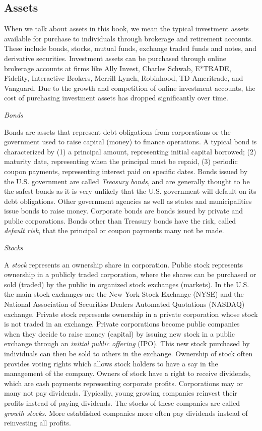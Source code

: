 \documentclass[
  letterpaper,
  DIV=11,
  numbers=noendperiod]{scrreprt}
\theoremstyle{definition}
\theoremstyle{definition}
\theoremstyle{remark}
\begin{document}
\hypertarget{assets}{%
\subsection{Assets}\label{assets}}

When we talk about assets in this book, we mean the typical investment
assets available for purchase to individuals through brokerage and
retirement accounts. These include bonds, stocks, mutual funds, exchange
traded funds and notes, and derivative securities. Investment assets can
be purchased through online brokerage accounts at firms like Ally
Invest, Charles Schwab, E*TRADE, Fidelity, Interactive Brokers, Merrill
Lynch, Robinhood, TD Ameritrade, and Vanguard. Due to the growth and
competition of online investment accounts, the cost of purchasing
investment assets has dropped significantly over time.

\emph{Bonds}

Bonds are assets that represent debt obligations from corporations or
the government used to raise capital (money) to finance operations. A
typical bond is characterized by (1) a principal amount, representing
initial capital borrowed; (2) maturity date, representing when the
principal must be repaid, (3) periodic coupon payments, representing
interest paid on specific dates. Bonds issued by the U.S. government are
called \emph{Treasury bonds}, and are generally thought to be the safest
bonds as it is very unlikely that the U.S. government will default on
its debt obligations. Other government agencies as well as states and
municipalities issue bonds to raise money. Corporate bonds are bonds
issued by private and public corporations. Bonds other than Treasury
bonds have the risk, called \emph{default risk}, that the principal or
coupon payments many not be made.

\emph{Stocks}

A \emph{stock} represents an ownership share in corporation. Public
stock represents ownership in a publicly traded corporation, where the
shares can be purchased or sold (traded) by the public in organized
stock exchanges (markets). In the U.S. the main stock exchanges are the
New York Stock Exchange (NYSE) and the National Association of
Securities Dealers Automated Quotations (NASDAQ) exchange. Private stock
represents ownership in a private corporation whose stock is not traded
in an exchange. Private corporations become public companies when they
decide to raise money (capital) by issuing new stock in a public
exchange through an \emph{initial public offering} (IPO). This new stock
purchased by individuals can then be sold to others in the exchange.
Ownership of stock often provides voting rights which allows stock
holders to have a say in the management of the company. Owners of stock
have a right to receive dividends, which are cash payments representing
corporate profits. Corporations may or many not pay dividends.
Typically, young growing companies reinvest their profits instead of
paying dividends. The stocks of these companies are called \emph{growth
stocks}. More established companies more often pay dividends instead of
reinvesting all profits.
\end{document}
